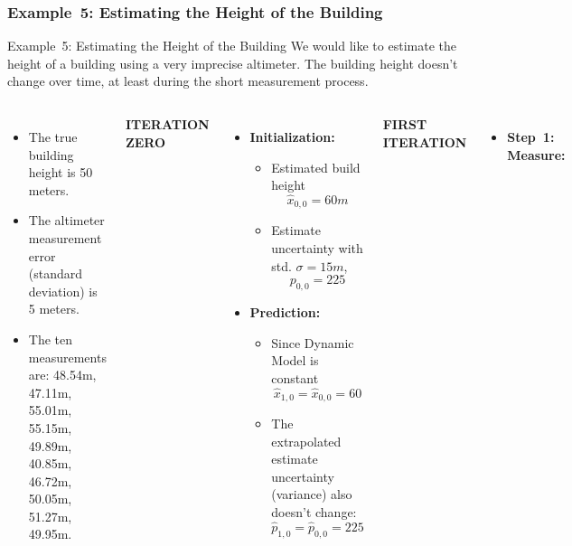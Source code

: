 \subsubsection{Example~5: Estimating the Height of the Building}
\begin{frame}{Example~5: Estimating the Height of the Building}
\vspace{-5pt}
We would like to estimate the height of a building using a very imprecise altimeter. The building height doesn't change over time, at least during the short measurement process.

\begin{columns}
    \begin{itemize}
        \item The true building height is 50 meters.
        \item The altimeter measurement error (standard deviation) is 5 meters.
        \item The ten measurements are: 48.54m, 47.11m, 55.01m, 55.15m, 49.89m, 40.85m, 46.72m, 50.05m, 51.27m, 49.95m.
    \end{itemize}
    \textbf{ITERATION ZERO}
    \begin{itemize}
        \item \textbf{Initialization:}
        \begin{itemize}
            \item Estimated build height
            $$\hat{x}_{0,0} = 60m$$
            \item Estimate uncertainty with std. $\sigma = 15m$,
            $$p_{0,0} = 225$$
        \end{itemize}
        \item \textbf{Prediction:}
            \begin{itemize}
                \item Since Dynamic Model is constant
                $$\hat{x}_{1,0}= \hat{x}_{0,0} = 60$$
                \item The extrapolated estimate uncertainty (variance) also doesn't change:
                $$\hat{p}_{1,0}= \hat{p}_{0,0} = 225$$
            \end{itemize}
    \end{itemize}
    \textbf{FIRST ITERATION}
    \begin{itemize}
        \item \textbf{Step~1: Measure:}
            \begin{itemize}

\end{itemize}
\end{itemize}
\end{columns}
\end{frame}
